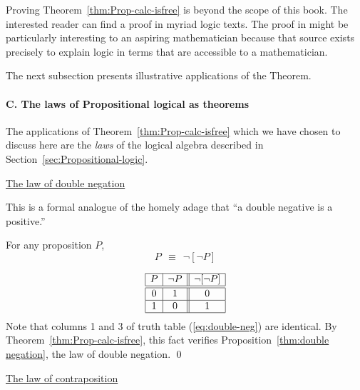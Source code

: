 Proving Theorem~\ref{thm:Prop-calc-isfree} is beyond the scope of this book.  The interested reader can find a proof in myriad logic texts.  The proof in  \cite{Rosser53} might be particularly interesting to an aspiring mathematician because that source exists precisely to explain logic in terms that are accessible to a mathematician.

\bigskip

The next subsection presents illustrative applications of the Theorem.

\paragraph{C. The laws of Propositional logical as theorems}

The applications of Theorem~\ref{thm:Prop-calc-isfree} which we have chosen to discuss here are the {\em laws} of the logical algebra described in Section~\ref{sec:Propositional-logic}.

\bigskip

\noindent
\underline{\small\sf The law of double negation}

\smallskip

\noindent
This is a formal analogue of the homely adage that ``a double negative is a positive.''

\begin{prop}
\label{thm:double negation}
For any proposition $P$,
\[ P \ \ \equiv \ \ \neg [\neg P] \]
\end{prop}

\begin{equation}
\label{eq:double-neg}
\begin{array}{|c|c||c|}
\hline
P & \neg P & \neg[\neg P] \\
\hline
\hline
0 & 1 & 0 \\
\hline
1 & 0 & 1 \\
\hline
\end{array}
\end{equation}
Note that columns 1 and 3 of truth table (\ref{eq:double-neg}) are identical.  By Theorem~\ref{thm:Prop-calc-isfree}, this fact verifies Proposition~\ref{thm:double negation}, the law of double negation.  \qed

\bigskip

\noindent 
\underline{\small\sf The law of contraposition}

